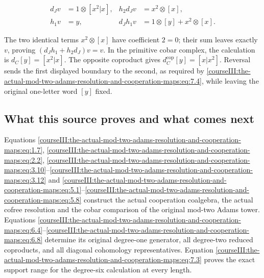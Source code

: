 \begin{equation}
\begin{aligned}
 d_Jv&=1\otimes[x^2|x],
 &h_2d_Jv&=x^2\otimes[x],\\
 h_1v&=y,
 &d_Jh_1v&=1\otimes[y]+x^2\otimes[x].
 \end{aligned}
 \label{courseIII:the-actual-mod-two-adams-resolution-and-cooperation-maps:eq:8.7}
\end{equation}

The two identical terms \(x^2\otimes[x]\) have coefficient \(2=0\); their sum leaves exactly \(v\), proving \((d_Jh_1+h_2d_J)v=v\). In the primitive cobar complex, the calculation is \(d_C[y]=[x^2|x]\). The opposite coproduct gives \(d_C^{\mathrm{cop}}[y]=[x|x^2]\). Reversal sends the first displayed boundary to the second, as required by \eqref{courseIII:the-actual-mod-two-adams-resolution-and-cooperation-maps:eq:7.4}, while leaving the original one-letter word \([y]\) fixed.

\subsection{What this source proves and what comes next}
\label{courseIII:the-actual-mod-two-adams-resolution-and-cooperation-maps:cooperation-scope}

\label{courseIII:the-actual-mod-two-adams-resolution-and-cooperation-maps:section-9}

Equations \eqref{courseIII:the-actual-mod-two-adams-resolution-and-cooperation-maps:eq:1.7}, \eqref{courseIII:the-actual-mod-two-adams-resolution-and-cooperation-maps:eq:2.2}, \eqref{courseIII:the-actual-mod-two-adams-resolution-and-cooperation-maps:eq:3.10}--\eqref{courseIII:the-actual-mod-two-adams-resolution-and-cooperation-maps:eq:3.12} and \eqref{courseIII:the-actual-mod-two-adams-resolution-and-cooperation-maps:eq:5.1}--\eqref{courseIII:the-actual-mod-two-adams-resolution-and-cooperation-maps:eq:5.8} construct the actual cooperation coalgebra, the actual cofree resolution and the cobar comparison of the original mod-two Adams tower. Equations \eqref{courseIII:the-actual-mod-two-adams-resolution-and-cooperation-maps:eq:6.4}--\eqref{courseIII:the-actual-mod-two-adams-resolution-and-cooperation-maps:eq:6.8} determine its original degree-one generator, all degree-two reduced coproducts, and all diagonal cohomology representatives. Equation \eqref{courseIII:the-actual-mod-two-adams-resolution-and-cooperation-maps:eq:7.3} proves the exact support range for the degree-six calculation at every length.

